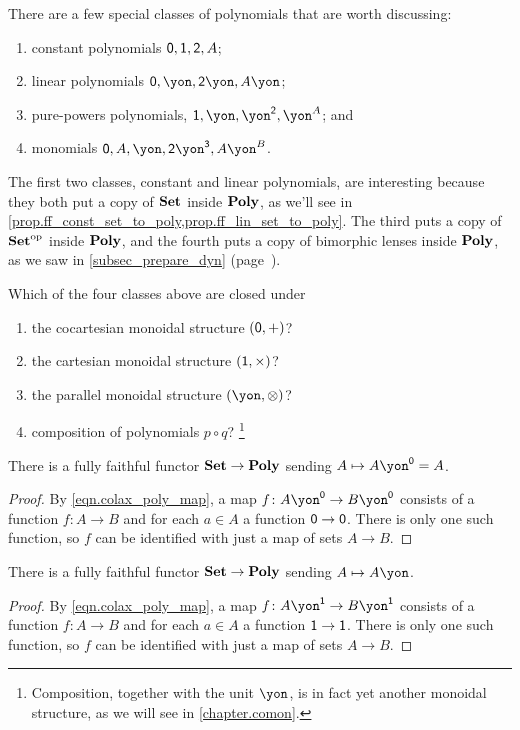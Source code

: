 \documentclass[Book-Poly]{subfiles}
\begin{document}
There are a few special classes of polynomials that are worth discussing: 
\begin{enumerate}
	\item constant polynomials $\textsf{0},\textsf{1},\textsf{2},A$; 
	\item linear polynomials $\0,\yon, \2\yon, A\yon$;
	\item pure-powers polynomials, $\1, \yon, \yon^\2, \yon^A$; and 
	\item monomials $\0, A, \yon, \2\yon^\3, A\yon^B$.
\end{enumerate}
The first two classes, constant and linear polynomials, are interesting because they both put a copy of $\textbf{Set}$ inside $\textbf{Poly}$, as we'll see in \cref{prop.ff_const_set_to_poly,prop.ff_lin_set_to_poly}. The third puts a copy of $\textbf{Set}^{\textnormal{op}}$ inside $\textbf{Poly}$, and the fourth puts a copy of bimorphic lenses inside $\textbf{Poly}$, as we saw in \cref{subsec_prepare_dyn} (page~\pageref{page.bimorphic_lens}).

\begin{exercise}
Which of the four classes above are closed under
\begin{enumerate}
	\item the cocartesian monoidal structure $(\textsf{0},+)$?
	\item the cartesian monoidal structure $(\textsf{1},\times)$?
	\item the parallel monoidal structure $(\yon,\otimes)$?
	\item composition of polynomials $p\circ q$?%
	\footnote{Composition, together with the unit $\yon$, is in fact yet another monoidal structure, as we will see in \cref{chapter.comon}.}
\qedhere
\end{enumerate}
\end{exercise}

\begin{proposition}\label{prop.ff_const_set_to_poly}
There is a fully faithful functor $\textbf{Set}\to\textbf{Poly}$ sending $A\mapsto A\yon^\0=A$.
\end{proposition}
\begin{proof}
By \cref{eqn.colax_poly_map}, a map $f\colon A\yon^\0\to B\yon^\0$ consists of a function $f\colon A\to B$ and for each $a\in A$ a function $\textsf{0}\to\textsf{0}$. There is only one such function, so $f$ can be identified with just a map of sets $A\to B$.
\end{proof}

\begin{proposition}\label{prop.ff_lin_set_to_poly}
There is a fully faithful functor $\textbf{Set}\to\textbf{Poly}$ sending $A\mapsto A\yon$.
\end{proposition}
\begin{proof}
By \cref{eqn.colax_poly_map}, a map $f\colon A\yon^\1\to B\yon^\1$ consists of a function $f\colon A\to B$ and for each $a\in A$ a function $\textsf{1}\to\textsf{1}$. There is only one such function, so $f$ can be identified with just a map of sets $A\to B$.
\end{proof}
\end{document}
